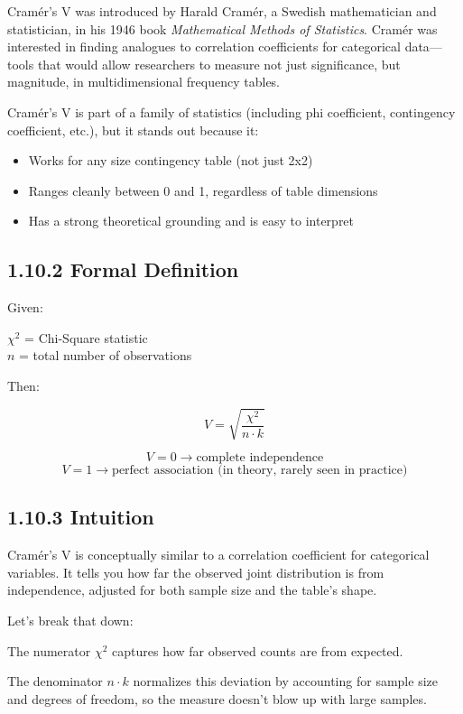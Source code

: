 \documentclass[12pt]{article}
\begin{document}
Cramér’s V was introduced by Harald Cramér, a Swedish mathematician and statistician, in his 1946 book \textit{Mathematical Methods of Statistics}. Cramér was interested in finding analogues to correlation coefficients for categorical data—tools that would allow researchers to measure not just significance, but magnitude, in multidimensional frequency tables.

Cramér’s V is part of a family of statistics (including phi coefficient, contingency coefficient, etc.), but it stands out because it:

\begin{itemize}
  \item Works for any size contingency table (not just 2x2)
  \item Ranges cleanly between 0 and 1, regardless of table dimensions
  \item Has a strong theoretical grounding and is easy to interpret
\end{itemize}

\subsection*{1.10.2 Formal Definition}

Given:

\(\chi^2\) = Chi-Square statistic \\
\(n\) = total number of observations

Then:

\[
V = \sqrt{ \frac{\chi^2}{n \cdot k} }
\]

\[
V = 0 \rightarrow \text{complete independence}
\]
\[
V = 1 \rightarrow \text{perfect association (in theory, rarely seen in practice)}
\]

\subsection*{1.10.3 Intuition}

Cramér’s V is conceptually similar to a correlation coefficient for categorical variables. It tells you how far the observed joint distribution is from independence, adjusted for both sample size and the table's shape.

Let’s break that down:

The numerator \(\chi^2\) captures how far observed counts are from expected.

The denominator \(n \cdot k\) normalizes this deviation by accounting for sample size and degrees of freedom, so the measure doesn't blow up with large samples.
\end{document}
